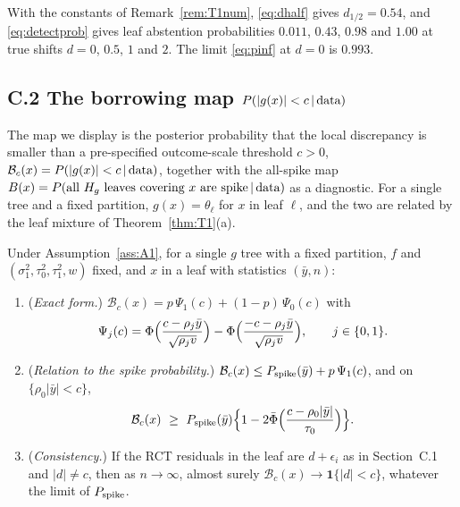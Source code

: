 \begin{remA}\label{rem:T2num}
With the constants of Remark~\ref{rem:T1num}, \eqref{eq:dhalf} gives $d_{1/2}=0.54$, and \eqref{eq:detectprob} gives leaf abstention probabilities $0.011$, $0.43$, $0.98$ and $1.00$ at true shifts $d=0$, $0.5$, $1$ and $2$. The limit \eqref{eq:pinf} at $d=0$ is $0.993$.
\end{remA}

\subsection*{C.2 The borrowing map $P(|g(x)|<c\,\vert\,\text{data})$}

The map we display is the posterior probability that the local discrepancy is smaller than a pre-specified outcome-scale threshold $c>0$, $\mathcal B_c(x)=P(|g(x)|<c\,\vert\,\text{data})$, together with the all-spike map $B(x)=P(\text{all }H_g\text{ leaves covering }x\text{ are spike}\,\vert\,\text{data})$ as a diagnostic. For a single tree and a fixed partition, $g(x)=\theta_\ell$ for $x$ in leaf $\ell$, and the two are related by the leaf mixture of Theorem~\ref{thm:T1}(a).

\begin{thmA}\label{thm:gmap}
Under Assumption~\ref{ass:A1}, for a single $g$ tree with a fixed partition, $f$ and $(\sigma_1^2,\tau_0^2,\tau_1^2,w)$ fixed, and $x$ in a leaf with statistics $(\bar y,n)$:
\begin{enumerate}[label=(\alph*),leftmargin=2.2em]
\item (\emph{Exact form.}) $\mathcal B_c(x)=p\,\Psi_1(c)+(1-p)\,\Psi_0(c)$ with
\[
\Psi_j(c)=\Phi\Bigl(\frac{c-\rho_j\bar y}{\sqrt{\rho_jv}}\Bigr)-\Phi\Bigl(\frac{-c-\rho_j\bar y}{\sqrt{\rho_jv}}\Bigr),\qquad j\in\{0,1\}.
\]
\item (\emph{Relation to the spike probability.}) $\mathcal B_c(x)\le P_{\mathrm{spike}}(\bar y)+p\,\Psi_1(c)$, and on $\{\rho_0|\bar y|<c\}$,
\[
\mathcal B_c(x)\ \ge\ P_{\mathrm{spike}}(\bar y)\Bigl\{1-2\bar\Phi\Bigl(\frac{c-\rho_0|\bar y|}{\tau_0}\Bigr)\Bigr\}.
\]
\item (\emph{Consistency.}) If the RCT residuals in the leaf are $d+\epsilon_i$ as in Section~C.1 and $|d|\ne c$, then as $n\to\infty$, almost surely $\mathcal B_c(x)\to\mathbf 1\{|d|<c\}$, whatever the limit of $P_{\mathrm{spike}}$.
\end{enumerate}
\end{thmA}

